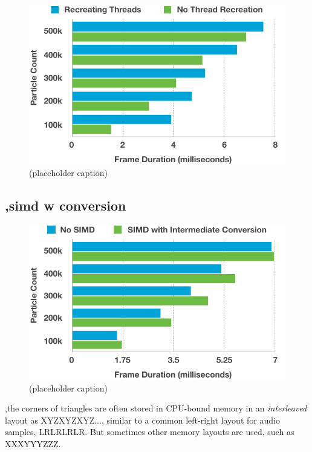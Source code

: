 \documentclass[11pt, a4paper, twocolumn]{article}
\begin{document}
\begin{figure}[h]
\includegraphics[width=\linewidth]{recreate-no-recreation}
\caption{(placeholder caption)}
\label{fig:recreate-no-recreation}
\end{figure}

\subsection{,simd w conversion} \label{sec:simd}

\lipsum[1-1]

\begin{figure}[h]
\includegraphics[width=\linewidth]{nosimd-slowsimd}
\caption{(placeholder caption)}
\label{fig:nosimd-slowsimd}
\end{figure}

,the corners of triangles are often stored in CPU-bound memory in an \emph{interleaved} layout as XYZXYZXYZ..., similar to a common left-right layout for audio samples, LRLRLRLR. But sometimes other memory layouts are used, such as XXXYYYZZZ.
\end{document}
